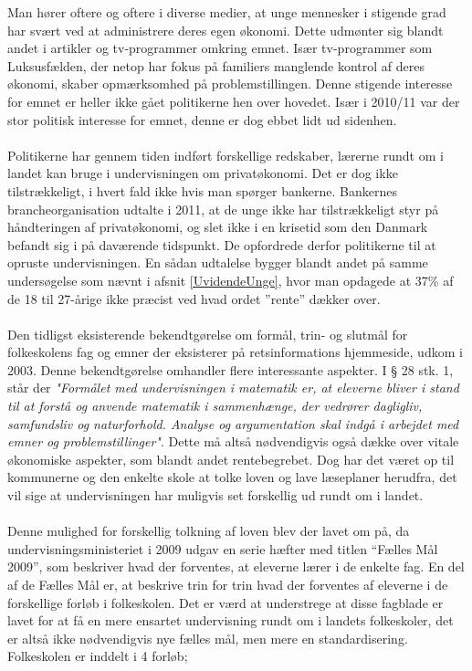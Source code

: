 \label{okonomipaaskemaet}

Man hører oftere og oftere i diverse medier, at unge mennesker i stigende grad har svært ved at administrere deres egen økonomi. Dette udmønter sig blandt andet i artikler og tv-programmer omkring emnet. Især tv-programmer som Luksusfælden, der netop har fokus på familiers manglende kontrol af deres økonomi, skaber opmærksomhed på problemstillingen. Denne stigende interesse for emnet er heller ikke gået politikerne hen over hovedet. Især i 2010/11 var der stor politisk interesse for emnet, denne er dog ebbet lidt ud sidenhen.\\
\\
Politikerne har gennem tiden indført forskellige redskaber, lærerne rundt om i landet kan bruge i undervisningen om privatøkonomi. Det er dog ikke tilstrækkeligt, i hvert fald ikke hvis man spørger bankerne. Bankernes brancheorganisation udtalte i 2011, at de unge ikke har tilstrækkeligt styr på håndteringen af privatøkonomi, og slet ikke i en krisetid som den Danmark befandt sig i på daværende tidspunkt. De opfordrede derfor politikerne til at opruste undervisningen. En sådan udtalelse bygger blandt andet på samme undersøgelse som nævnt i afsnit \ref{UvidendeUnge}, hvor man opdagede at 37\% af de 18 til 27-årige ikke præcist ved hvad ordet ”rente” dækker over.\\ %
\\
Den tidligst eksisterende bekendtgørelse om formål, trin- og slutmål for folkeskolens fag og emner der eksisterer på retsinformations hjemmeside, udkom i 2003. Denne bekendtgørelse omhandler flere interessante aspekter. I § 28 stk. 1, står der \textit{"Formålet med undervisningen i matematik er, at eleverne bliver i stand til at forstå og anvende matematik i sammenhænge, der vedrører dagligliv, samfundsliv og naturforhold. Analyse og argumentation skal indgå i arbejdet med emner og problemstillinger"}. Dette må altså nødvendigvis også dække over vitale økonomiske aspekter, som blandt andet rentebegrebet. Dog har det været op til kommunerne og den enkelte skole at tolke loven og lave læseplaner herudfra, det vil sige at undervisningen har muligvis set forskellig ud rundt om i landet.\cite{Bekendtgorelse}\\
\\
Denne mulighed for forskellig tolkning af loven blev der lavet om på, da undervisningsministeriet i 2009 udgav en serie hæfter med titlen “Fælles Mål 2009”, som beskriver hvad der forventes, at eleverne lærer i de enkelte fag. En del af de Fælles Mål er, at beskrive trin for trin hvad der forventes af eleverne i de forskellige forløb i folkeskolen. Det er værd at understrege at disse fagblade er lavet for at få en mere ensartet undervisning rundt om i landets folkeskoler, det er altså ikke nødvendigvis nye fælles mål, men mere en standardisering. 
Folkeskolen er inddelt i 4 forløb;

